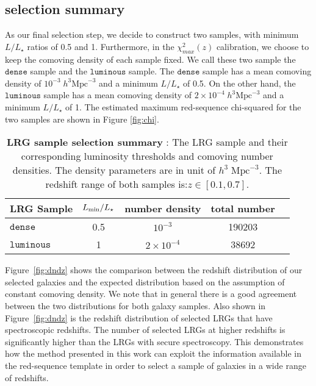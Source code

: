 \documentclass[fleqn,usenatbib]{mnras}
\begin{document}
\subsection{selection summary}

As our final selection step, we decide to construct two samples, with minimum $L/L_{\star}$ 
ratios of 0.5 and 1. Furthermore, in the $\chi^{2}_{max}(z)$ calibration, 
we choose to keep the comoving density of each sample fixed. We call these two sample the $\mathtt{dense}$ sample and the $\mathtt{luminous}$ sample. The $\mathtt{dense}$ sample has a mean comoving density of $10^{-3}\;h^{3}\mathrm{Mpc}^{-3}$ and a minimum $L/L_{\star}$ of 0.5. On the other hand, the $\mathtt{luminous}$ sample has a mean comoving density of $2\times10^{-4}\;h^{3}\mathrm{Mpc}^{-3}$ and a minimum $L/L_{\star}$ of 1. The estimated maximum red-sequence chi-squared for the two samples are shown in Figure \ref{fig:chi}.  


\begin{table}
	\centering
	\caption{{\bf LRG sample selection summary }: The LRG sample and their corresponding luminosity thresholds and comoving number densities. The density parameters are in unit of $h^{3}\;\mathrm{Mpc}^{-3}$. The redshift range of both samples is:$z \in [0.1,0.7]$.}
	\label{tab:prior}
	\begin{tabular}{lcccr} %
		\hline
		LRG Sample & $L_{\rm min}/L_{\star}$ & number density & total number\\
		\hline
		$\mathtt{dense}$ & 0.5 & $10^{-3}$ & 190203\\
		$\mathtt{luminous}$ & 1 & $2\times 10^{-4}$ & 38692\\
		\hline
	\end{tabular}
\end{table}

Figure~\ref{fig:dndz} shows the comparison between the redshift distribution of our selected galaxies and the expected distribution based on the assumption of constant comoving density. We note that in general there is a good agreement between the two distributions for both galaxy samples. Also shown in Figure~\ref{fig:dndz} is the redshift distribution of selected LRGs that have spectroscopic redshifts. The number of selected LRGs at higher redshifts is significantly higher than the LRGs with secure spectroscopy. This demonstrates how the method presented in this work can exploit the information available in the red-sequence template in order to select a sample of galaxies in a wide range of redshifts. 
\end{document}
